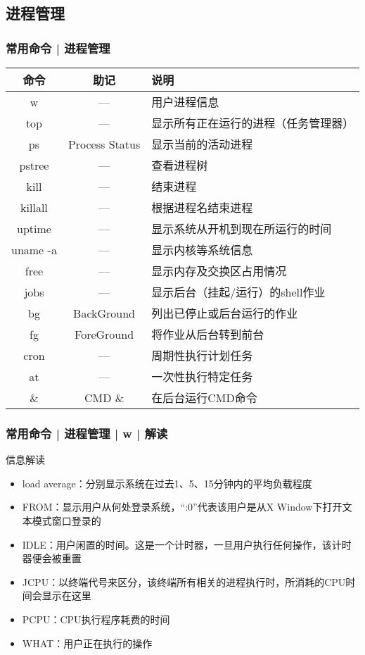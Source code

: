 \subsection{进程管理}
\begin{frame}
  \frametitle{常用命令 | \alert{进程管理}}
  \begin{table}
    \centering
    \begin{tabularx}{\textwidth}{ccX}
      \hline
      \rowcolor{blue!50}命令 & 助记 & 说明\\
      \hline
      w & --- & 用户进程信息\\
      top & --- & 显示所有正在运行的进程（任务管理器）\\
      ps & Process Status & 显示当前的活动进程\\
      pstree & --- & 查看进程树\\
      kill & --- & 结束进程\\
      killall & --- & 根据进程名结束进程\\
      uptime & --- & 显示系统从开机到现在所运行的时间\\
      uname -a & --- & 显示内核等系统信息\\
      free & --- & 显示内存及交换区占用情况\\
      jobs & --- & 显示后台（挂起/运行）的shell作业\\
      bg & BackGround & 列出已停止或后台运行的作业\\
      fg & ForeGround & 将作业从后台转到前台\\
      cron & --- & 周期性执行计划任务\\
      at & --- & 一次性执行特定任务\\
      \& & CMD \& & 在后台运行CMD命令\\
      \hline
    \end{tabularx}
  \end{table}
\end{frame}

\begin{frame}
  \frametitle{常用命令 | 进程管理 | w | 解读}
  \begin{block}{信息解读}
    \begin{itemize}
      \item load average：分别显示系统在过去1、5、15分钟内的平均负载程度
      \item FROM：显示用户从何处登录系统，“:0”代表该用户是从X Window下打开文本模式窗口登录的
      \item IDLE：用户闲置的时间。这是一个计时器，一旦用户执行任何操作，该计时器便会被重置
      \item JCPU：以终端代号来区分，该终端所有相关的进程执行时，所消耗的CPU时间会显示在这里
      \item PCPU：CPU执行程序耗费的时间
      \item WHAT：用户正在执行的操作
    \end{itemize}
  \end{block}
\end{frame}

